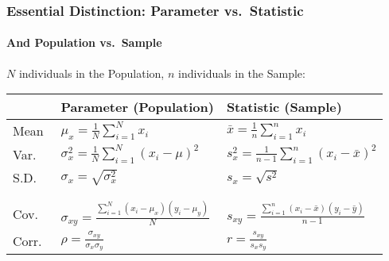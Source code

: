 \begin{frame}

\frametitle{Essential Distinction: Parameter vs.\ Statistic}
\framesubtitle{And Population vs.\ Sample}
$N$ individuals in the Population, $n$ individuals in the Sample:

\vspace{1em}
\small
\begin{tabular}{l|l|l}
	&\textbf{Parameter} (Population)&\textbf{Statistic} (Sample)\\
	\hline
	Mean&$\displaystyle\mu_x = \frac{1}{N} \sum_{i=1}^N x_i$& $\displaystyle\bar{x} = \frac{1}{n} \sum_{i=1}^n x_i$ \\
	Var.\ &$\displaystyle \sigma_x^2 = \frac{1}{N}\sum_{i=1}^N (x_i - \mu)^2$ &$\displaystyle s_x^2 = \frac{1}{n-1}\sum_{i=1}^n(x_i - \bar{x})^2$\\
	S.D.\ &$\sigma_x = \sqrt{\sigma_x^2}$ &$s_x = \sqrt{s^2}$ \\
	&&\\
	\hline
	&&\\
	\alert{Cov.\ }&\alert{$\displaystyle \sigma_{xy} = \frac{\sum_{i=1}^N(x_i - \mu_x)(y_i - \mu_y)}{N}$} &\alert{$\displaystyle s_{xy} = \frac{\sum_{i=1}^n(x_i - \bar{x})(y_i - \bar{y})}{n-1}$}\\
	\alert{Corr.\ } & \alert{$\displaystyle \rho = \frac{\sigma_{xy}}{\sigma_x \sigma_y}$}& \alert{$\displaystyle r = \frac{s_{xy}}{s_x s_y}$}
\end{tabular}

\end{frame}
